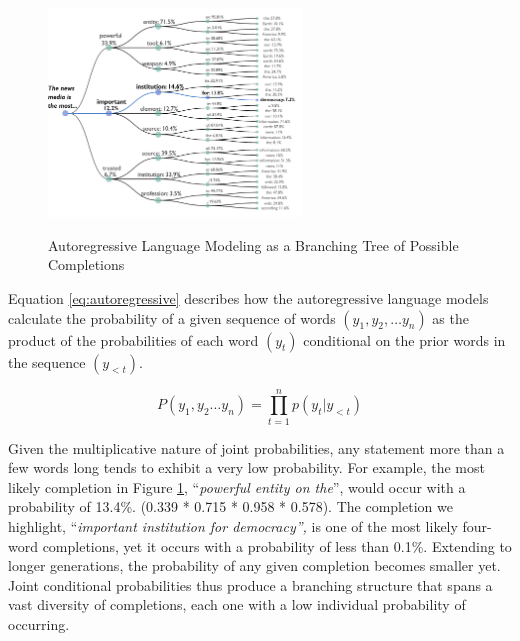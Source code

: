 \documentclass{article}
\begin{document}
\begin{figure}
  \captionsetup{justification=raggedright,singlelinecheck=false}
  \caption{Autoregressive Language Modeling as a Branching Tree of Possible Completions}
  \centering
  \includegraphics[width=0.6\textwidth]{./figures/media/image1.png}
  \label{fig:autoregress}
\end{figure}

Equation \ref{eq:autoregressive} describes how the autoregressive language models calculate the probability of a given sequence of words $(y_1, y_2, \ldots y_n)$ as the product of the probabilities of each word $(y_t)$ conditional on the prior words in the sequence $(y_{<t})$.

\begin{equation}
  P(y_1, y_2\dots y_n) = \prod_{t = 1}^{n}p(y_t|y_{<t})
  \label{eq:autoregressive}
\end{equation}

Given the multiplicative nature of joint probabilities, any statement
more than a few words long tends to exhibit a very low probability.
For example, the most likely completion in Figure \ref{fig:autoregress},
``\emph{powerful entity on the}'', would occur with a probability of 13.4\%.
(0.339 * 0.715 * 0.958 * 0.578). The completion we highlight, ``\emph{important
institution for democracy'',} is one of the most likely four-word completions,
yet it occurs with a probability of less than 0.1\%. Extending to longer
generations, the probability of any given completion becomes smaller yet.
Joint conditional probabilities thus produce a branching structure that spans
a vast diversity of completions, each one with a low individual probability of
occurring.
\end{document}
